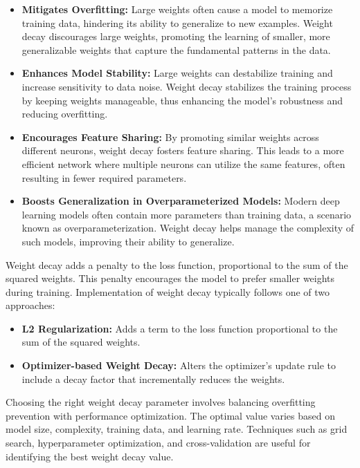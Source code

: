 \documentclass[12pt,a4paper]{report}
\begin{document}
\begin{itemize}
  \item \textbf{Mitigates Overfitting:} Large weights often cause a model to memorize training data, hindering its ability to generalize to new examples. Weight decay discourages large weights, promoting the learning of smaller, more generalizable weights that capture the fundamental patterns in the data.

  \item \textbf{Enhances Model Stability:} Large weights can destabilize training and increase sensitivity to data noise. Weight decay stabilizes the training process by keeping weights manageable, thus enhancing the model's robustness and reducing overfitting.

  \item \textbf{Encourages Feature Sharing:} By promoting similar weights across different neurons, weight decay fosters feature sharing. This leads to a more efficient network where multiple neurons can utilize the same features, often resulting in fewer required parameters.

  \item \textbf{Boosts Generalization in Overparameterized Models:} Modern deep learning models often contain more parameters than training data, a scenario known as overparameterization. Weight decay helps manage the complexity of such models, improving their ability to generalize.
\end{itemize}

Weight decay adds a penalty to the loss function, proportional to the sum of the squared weights. This penalty encourages the model to prefer smaller weights during training. Implementation of weight decay typically follows one of two approaches:

\begin{itemize}
  \item \textbf{L2 Regularization:} Adds a term to the loss function proportional to the sum of the squared weights.
  \item \textbf{Optimizer-based Weight Decay:} Alters the optimizer's update rule to include a decay factor that incrementally reduces the weights.
\end{itemize}

Choosing the right weight decay parameter involves balancing overfitting prevention with performance optimization. The optimal value varies based on model size, complexity, training data, and learning rate. Techniques such as grid search, hyperparameter optimization, and cross-validation are useful for identifying the best weight decay value.
\end{document}
